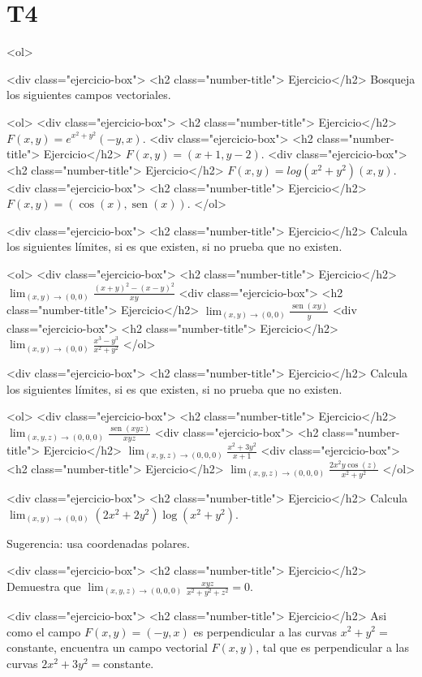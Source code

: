 \documentclass{article}
\theoremstyle{definition}
\newcommand{\sen}{\operatorname{sen}}
\begin{document}
  \section*{T4}
  
  
  
  <ol>

	<div class="ejercicio-box"> <h2 class="number-title"> Ejercicio</h2> Bosqueja los siguientes campos vectoriales.

	
	<ol>
	<div class="ejercicio-box"> <h2 class="number-title"> Ejercicio</h2> $F(x,y)=e^{x^2+y^2}(-y,x)$.
	<div class="ejercicio-box"> <h2 class="number-title"> Ejercicio</h2> $F(x,y)=(x+1,y-2)$.
	<div class="ejercicio-box"> <h2 class="number-title"> Ejercicio</h2> $F(x,y)=log(x^2+y^2)(x,y)$.
	<div class="ejercicio-box"> <h2 class="number-title"> Ejercicio</h2> $F(x,y)=(\cos(x),\sen(x))$.
	</ol>


  <div class="ejercicio-box"> <h2 class="number-title"> Ejercicio</h2> Calcula los siguientes límites, si es que existen, si no prueba que no existen.
  
  <ol>
  <div class="ejercicio-box"> <h2 class="number-title"> Ejercicio</h2> $\lim_{(x,y)\to (0,0)} \frac{(x+y)^2-(x-y)^2}{xy}$
  <div class="ejercicio-box"> <h2 class="number-title"> Ejercicio</h2> $\lim_{(x,y)\to (0,0)} \frac{\sen(xy)}{y}$
  <div class="ejercicio-box"> <h2 class="number-title"> Ejercicio</h2> $\lim_{(x,y)\to (0,0)} \frac{x^3-y^3}{x^2+y^2}$
  </ol>
  
  <div class="ejercicio-box"> <h2 class="number-title"> Ejercicio</h2> Calcula los siguientes límites, si es que existen, si no prueba que no existen.


	<ol>
	<div class="ejercicio-box"> <h2 class="number-title"> Ejercicio</h2> $\lim_{(x,y,z)\to (0,0,0)}\frac{\sen(xyz)}{xyz}$
	<div class="ejercicio-box"> <h2 class="number-title"> Ejercicio</h2> $\lim_{(x,y,z) \to (0,0,0)} \frac{x^2+3y^2}{x+1}$
	<div class="ejercicio-box"> <h2 class="number-title"> Ejercicio</h2> $\lim_{(x,y,z)\to (0,0,0)} \frac{2x^2y\cos(z)}{x^2+y^2}$
</ol>	  
  
  
  <div class="ejercicio-box"> <h2 class="number-title"> Ejercicio</h2> Calcula $\lim_{(x,y)\to (0,0)} (2x^2+2y^2)\log(x^2+y^2)$.
  
  Sugerencia: usa coordenadas polares.

  <div class="ejercicio-box"> <h2 class="number-title"> Ejercicio</h2> Demuestra que $\lim_{(x,y,z)\to (0,0,0)}\frac{xyz}{x^2+y^2+z^2}=0$.

<div class="ejercicio-box"> <h2 class="number-title"> Ejercicio</h2> Asi como el campo $F(x,y)=(-y,x)$ es perpendicular a las curvas $x^2+y^2=$constante, encuentra un campo vectorial $F(x,y)$, tal que es perpendicular a las curvas $2x^2+3y^2=$constante.
\end{document}
